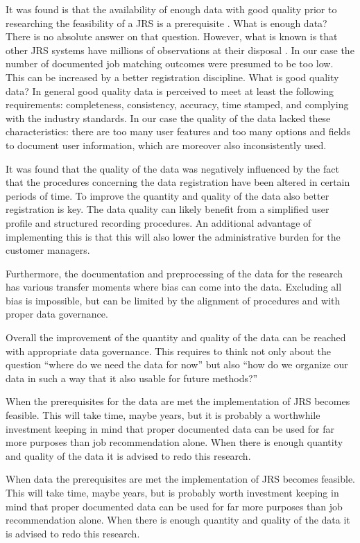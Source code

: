 It was found is that the availability of enough data with good quality prior to researching the feasibility of a JRS is a prerequisite .
What is enough data?
There is no absolute answer on that question. 
However, what is known is that other JRS systems have millions of observations at their disposal \cite{kenthapadi2017personalized, T.Al-Otaibi2012ASystems, Zheng2012JobSurvey, hong2013job}.
In our case the number of documented job matching outcomes were presumed to be too low. 
This can be increased by a better registration discipline.
What is good quality data?
In general good quality data is perceived to meet at least the following requirements: completeness, consistency, accuracy, time stamped, and complying with the industry standards. 
In our case the quality of the data lacked these characteristics: there are too many user features and too many options and fields to document user information, which are moreover also inconsistently used. 

It was found that the quality of the data was negatively influenced by the fact that the procedures concerning the data registration have been altered in certain periods of time. 
To improve the quantity and quality of the data also better registration is key.
The data quality can likely benefit from a simplified user profile and structured recording procedures. 
An additional advantage of implementing this is that this will also lower the administrative burden for the customer managers.

Furthermore, the documentation and preprocessing of the data for the research has various transfer moments where bias can come into the data. 
Excluding all bias is impossible, but can be limited by the alignment of procedures and with proper data governance.

Overall the improvement of the quantity and quality of the data can be reached with appropriate data governance. 
This requires to think not only about the question “where do we need the data for now” but also “how do we organize our data in such a way that it also usable for future methods?”

When the prerequisites for the data are met the implementation of JRS becomes feasible.
This will take time, maybe years, but it is probably a worthwhile  investment keeping in mind that proper documented data can be used for far more purposes than job recommendation alone.
When there is enough quantity and quality of the data it is advised to redo this research. 

When data the prerequisites are met the implementation of JRS becomes feasible.
This will take time, maybe years, but is probably worth investment keeping in mind that proper documented data can be used for far more purposes than job recommendation alone.
When there is enough quantity and quality of the data it is advised to redo this research. 


